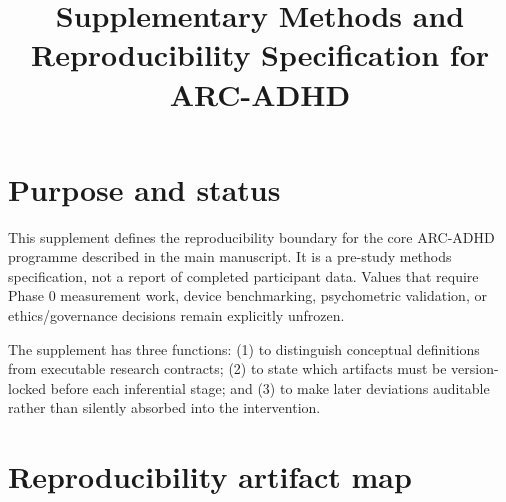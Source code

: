 \documentclass[man]{apa7}
\title{Supplementary Methods and Reproducibility Specification for ARC-ADHD}
\begin{document}
\maketitle

\section{Purpose and status}

This supplement defines the reproducibility boundary for the core ARC-ADHD programme described in the main manuscript. It is a pre-study methods specification, not a report of completed participant data. Values that require Phase 0 measurement work, device benchmarking, psychometric validation, or ethics/governance decisions remain explicitly unfrozen.

The supplement has three functions: (1) to distinguish conceptual definitions from executable research contracts; (2) to state which artifacts must be version-locked before each inferential stage; and (3) to make later deviations auditable rather than silently absorbed into the intervention.

\section{Reproducibility artifact map}
\end{document}

